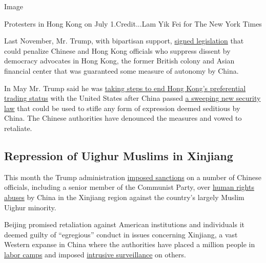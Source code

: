 Image

Protesters in Hong Kong on July 1.Credit...Lam Yik Fei for The New York
Times

Last November, Mr. Trump, with bipartisan support,
\href{https://www.nytimes3xbfgragh.onion/2019/11/27/us/politics/trump-hong-kong.html?searchResultPosition=1}{signed
legislation} that could penalize Chinese and Hong Kong officials who
suppress dissent by democracy advocates in Hong Kong, the former British
colony and Asian financial center that was guaranteed some measure of
autonomy by China.

In May Mr. Trump said he was
\href{https://www.cnbc.com/2020/05/29/trump-taking-action-to-eliminate-special-treatment-for-hong-kong.html}{taking
steps to end Hong Kong's preferential trading status} with the United
States after China passed
\href{https://www.nytimes3xbfgragh.onion/2020/07/05/world/asia/hong-kong-security-law.html}{a
sweeping new security law} that could be used to stifle any form of
expression deemed seditious by China. The Chinese authorities have
denounced the measures and vowed to retaliate.

\hypertarget{repression-of-uighur-muslims-in-xinjiang}{%
\subsection{Repression of Uighur Muslims in
Xinjiang}\label{repression-of-uighur-muslims-in-xinjiang}}

This month the Trump administration
\href{https://www.nytimes3xbfgragh.onion/2020/07/09/world/asia/trump-china-sanctions-uighurs.html?searchResultPosition=1}{imposed
sanctions} on a number of Chinese officials, including a senior member
of the Communist Party, over
\href{https://www.nytimes3xbfgragh.onion/2019/07/10/world/asia/china-xinjiang-rights.html?action=click\&module=RelatedCoverage\&pgtype=Article\&region=Footer}{human
rights abuses} by China in the Xinjiang region against the country's
largely Muslim Uighur minority.

Beijing promised retaliation against American institutions and
individuals it deemed guilty of ``egregious'' conduct in issues
concerning Xinjiang, a vast Western expanse in China where the
authorities have placed a million people in
\href{https://www.nytimes3xbfgragh.onion/2018/12/16/world/asia/xinjiang-china-forced-labor-camps-uighurs.html}{labor
camps} and imposed
\href{https://www.nytimes3xbfgragh.onion/interactive/2019/04/04/world/asia/xinjiang-china-surveillance-prison.html}{intrusive
surveillance} on others.

